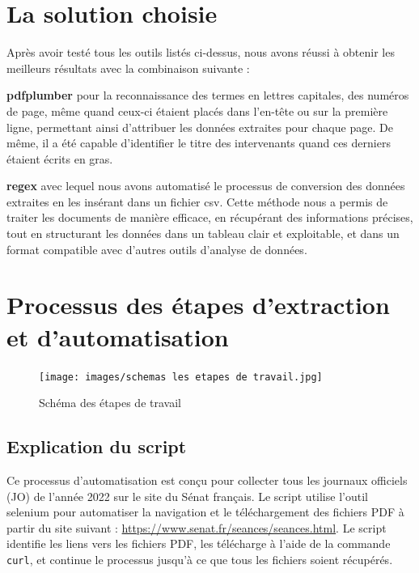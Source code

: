 

\section{La solution choisie}

Après avoir testé tous les outils listés ci-dessus, nous avons réussi à obtenir les meilleurs résultats avec la combinaison suivante :

\textbf{\gls{pdfplumber}} pour la reconnaissance des termes en lettres capitales, des numéros de page, même quand ceux-ci étaient placés dans l'en-tête ou sur la première ligne, permettant ainsi d'attribuer les données extraites pour chaque page. De même, il a été capable d'identifier le titre des intervenants quand ces derniers étaient écrits en gras.

\textbf{\gls{regex}} avec lequel nous avons automatisé le processus de conversion des données extraites en les insérant dans un fichier \gls{csv}. Cette méthode nous a permis de traiter les documents de manière efficace, en récupérant des informations précises, tout en structurant les données dans un tableau clair et exploitable, et dans un format compatible avec d'autres outils d'analyse de données. 

\section{Processus des étapes d'extraction et d'automatisation}

\begin{figure}[h!]
    \centering
    \texttt{[image: images/schemas les etapes de travail.jpg]} %
    \caption{Schéma des étapes de travail}
    \label{fig:schema_travail}
\end{figure}

\subsection{Explication du script}

Ce processus d'automatisation est conçu pour collecter tous les journaux officiels (JO) de l'année 2022 sur le site du Sénat français. Le script utilise l'outil \gls{selenium} pour automatiser la navigation et le téléchargement des fichiers \gls{PDF} à partir du site suivant : \url{https://www.senat.fr/seances/seances.html}. 
Le script identifie les liens vers les fichiers \gls{PDF}, les télécharge à l'aide de la commande \texttt{curl}, et continue le processus jusqu'à ce que tous les fichiers soient récupérés.

